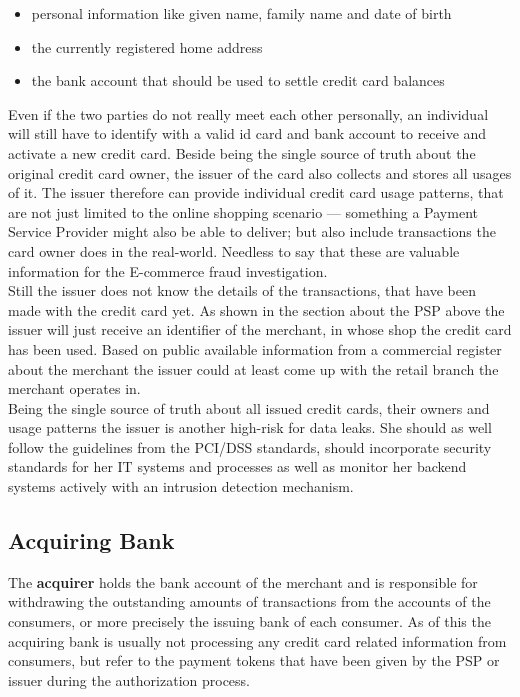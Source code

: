 \begin{itemize}
		\item personal information like given name, family name and date of birth
		\item the currently registered home address
		\item the bank account that should be used to settle credit card balances
\end{itemize}

Even if the two parties do not really meet each other personally, an individual will still have to identify with a valid id card and bank account to receive and activate a new credit card. Beside being the single source of truth about the original credit card owner, the issuer of the card also collects and stores all  usages of it. The issuer therefore can provide individual credit card usage patterns, that are not just limited to the online shopping scenario --- something a Payment Service Provider might also be able to deliver; but also include transactions the card owner does in the real-world. Needless to say that these are valuable information for the E-commerce fraud investigation. \\

Still the issuer does not know the details of the transactions, that have been made with the credit card yet. As shown in the section about the \gls{PSP} above the issuer will just receive an identifier of the merchant, in whose shop the credit card has been used. Based on public available information from a commercial register about the merchant the issuer could at least come up with the retail branch the merchant operates in. \\

Being the single source of truth about all issued credit cards, their owners and usage patterns the issuer is another high-risk for data leaks. She should as well follow the guidelines from the PCI/DSS standards, should incorporate security standards for her IT systems and processes as well as monitor her backend systems actively with an intrusion detection mechanism.


\subsection{Acquiring Bank}
\label{subsec:stakeholder_acquirer}

The \textbf{acquirer} holds the bank account of the merchant and is responsible for withdrawing the outstanding amounts of transactions from the accounts of the consumers, or more precisely the issuing bank of each consumer. As of this the acquiring bank is usually not processing any credit card related information from consumers, but refer to the payment tokens that have been given by the \gls{PSP} or issuer during the authorization process. \\

